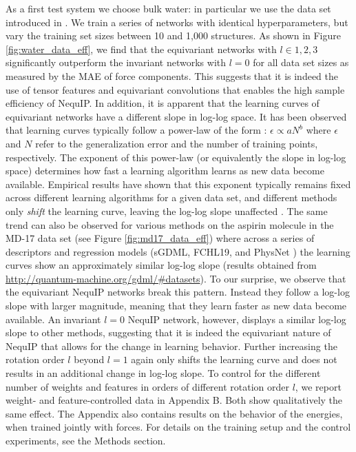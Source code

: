 \documentclass[%
reprint,
superscriptaddress,
nofootinbib,
amsmath,amssymb,
aps,
prl,
]{revtex4-1}
\begin{document}
As a first test system we choose bulk water: in particular we use the data set introduced in \cite{cheng2019ab}. We train a series of networks with identical hyperparameters, but vary the training set sizes between 10 and 1,000 structures. As shown in Figure \ref{fig:water_data_eff}, we find that the equivariant networks with $l \in {1, 2, 3}$ significantly outperform the invariant networks with $l=0$ for all data set sizes as measured by the MAE of force components. This suggests that it is indeed the use of tensor features and equivariant convolutions that enables the high sample efficiency of NequIP. In addition, it is apparent that the learning curves of equivariant networks have a different slope in log-log space. It has been observed that learning curves typically follow a power-law of the form \cite{hestness2017deep}: $\epsilon \propto aN^b$ where $\epsilon$ and $N$ refer to the generalization error and the number of training points, respectively. The exponent of this power-law (or equivalently the slope in log-log space) determines how fast a learning algorithm learns as new data become available. Empirical results have shown that this exponent typically remains fixed across different learning algorithms for a given data set, and different methods only \emph{shift} the learning curve, leaving the log-log slope unaffected \cite{hestness2017deep}. The same trend can also be observed for various methods on the aspirin molecule in the MD-17 data set (see Figure \ref{fig:md17_data_eff}) where across a series of descriptors and regression models (sGDML, FCHL19, and PhysNet \cite{sgdml, christensen2020fchl, physnet_jctc}) the learning curves show an approximately similar log-log slope (results obtained from \url{http://quantum-machine.org/gdml/#datasets}). To our surprise, we observe that the equivariant NequIP networks break this pattern. Instead they follow a log-log slope with larger magnitude, meaning that they learn faster as new data become available. An invariant $l=0$ NequIP network, however, displays a similar log-log slope to other methods, suggesting that it is indeed the equivariant nature of NequIP that allows for the change in learning behavior. Further increasing the rotation order $l$ beyond $l=1$ again only shifts the learning curve and does not results in an additional change in log-log slope. To control for the different number of weights and features in orders of different rotation order $l$, we report weight- and feature-controlled data in Appendix B. Both show qualitatively the same effect. The Appendix also contains results on the behavior of the energies, when trained jointly with forces. For details on the training setup and the control experiments, see the Methods section.\\
\end{document}
